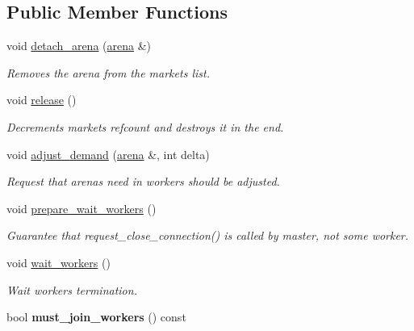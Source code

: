 \subsection*{Public Member Functions}
\begin{DoxyCompactItemize}
\item 
void \hyperlink{classtbb_1_1internal_1_1market_a5bd937cbff57f636998e1ef4466469e4}{detach\+\_\+arena} (\hyperlink{classtbb_1_1internal_1_1arena}{arena} \&)
\begin{DoxyCompactList}\small\item\em Removes the arena from the market\textquotesingle{}s list. \end{DoxyCompactList}\item 
\hypertarget{classtbb_1_1internal_1_1market_a9b7f01aecb4a290c02ff17d12e0d60c9}{}void \hyperlink{classtbb_1_1internal_1_1market_a9b7f01aecb4a290c02ff17d12e0d60c9}{release} ()\label{classtbb_1_1internal_1_1market_a9b7f01aecb4a290c02ff17d12e0d60c9}

\begin{DoxyCompactList}\small\item\em Decrements market\textquotesingle{}s refcount and destroys it in the end. \end{DoxyCompactList}\item 
void \hyperlink{classtbb_1_1internal_1_1market_a2147b4639190ad49551f617784dc012b}{adjust\+\_\+demand} (\hyperlink{classtbb_1_1internal_1_1arena}{arena} \&, int delta)
\begin{DoxyCompactList}\small\item\em Request that arena\textquotesingle{}s need in workers should be adjusted. \end{DoxyCompactList}\item 
void \hyperlink{classtbb_1_1internal_1_1market_a2245e4fb4c49fae9faf4bf01cdae280c}{prepare\+\_\+wait\+\_\+workers} ()
\begin{DoxyCompactList}\small\item\em Guarantee that request\+\_\+close\+\_\+connection() is called by master, not some worker. \end{DoxyCompactList}\item 
\hypertarget{classtbb_1_1internal_1_1market_aeed995612c0beb8d499c193cec82c56d}{}void \hyperlink{classtbb_1_1internal_1_1market_aeed995612c0beb8d499c193cec82c56d}{wait\+\_\+workers} ()\label{classtbb_1_1internal_1_1market_aeed995612c0beb8d499c193cec82c56d}

\begin{DoxyCompactList}\small\item\em Wait workers termination. \end{DoxyCompactList}\item 
\hypertarget{classtbb_1_1internal_1_1market_ab003a9b9b9f83bf6d7a1de469cd72319}{}bool {\bfseries must\+\_\+join\+\_\+workers} () const \label{classtbb_1_1internal_1_1market_ab003a9b9b9f83bf6d7a1de469cd72319}


\end{DoxyCompactItemize}
